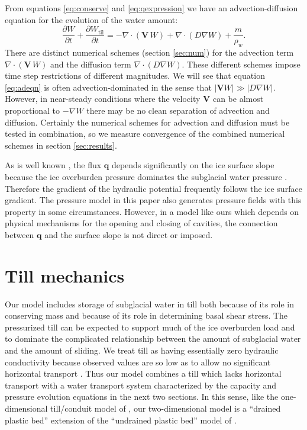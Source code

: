 \documentclass[11pt,final]{amsart}
\newcommand\bV{\mathbf{V}}
\newcommand\bq{\mathbf{q}}
\newcommand{\Div}{\nabla\cdot}
\newcommand{\grad}{\nabla}
\newcommand{\Wtil}{W_{\text{til}}}
\begin{document}
From equations \eqref{eq:conserve} and \eqref{eq:qexpression} we have an advection-diffusion equation \citep{HundsdorferVerwer2010} for the evolution of the water amount:
\begin{equation} \label{eq:adeqn}
  \frac{\partial W}{\partial t} + \frac{\partial \Wtil}{\partial t} = - \Div\left(\bV\, W\right) + \Div \left(D \grad W\right) + \frac{m}{\rho_w}.
\end{equation}
There are distinct numerical schemes (section \ref{sec:num}) for the advection term $\Div\left(\bV\, W\right)$ and the diffusion term $\Div \left(D \grad W\right)$.  These different schemes impose time step restrictions of different magnitudes.  We will see that equation \eqref{eq:adeqn} is often advection-dominated in the sense that $|\bV W| \gg |D \grad W|$.  However, in near-steady conditions where the velocity $\bV$ can be almost proportional to $-\grad W$ there may be no clean separation of advection and diffusion.  Certainly the numerical schemes for advection and diffusion must be tested in combination, so we measure convergence of the combined numerical schemes in section \ref{sec:results}.

As is well known \citep{Clarke05}, the flux $\bq$ depends significantly on the ice surface slope because the ice overburden pressure dominates the subglacial water pressure \citep{Shreve1972}.  Therefore the gradient of the hydraulic potential frequently follows the ice surface gradient.  The pressure model in this paper also generates pressure fields with this property in some circumstances.  However, in a model like ours which depends on physical mechanisms for the opening and closing of cavities, the connection between $\bq$ and the surface slope is not direct or imposed.



\section{Till mechanics} \label{sec:tillmechanics}

Our model includes storage of subglacial water in till both because of its role in conserving mass and because of its role in determining basal shear stress.  The pressurized till can be expected to support much of the ice overburden load and to dominate the complicated relationship between the amount of subglacial water and the amount of sliding.  We treat till as having essentially zero hydraulic conductivity because observed values are so low as to allow no significant horizontal transport \citep{LingleBrown1987,Tulaczyketal2000}.  Thus our model combines a till which lacks horizontal transport with a water transport system characterized by the capacity and pressure evolution equations in the next two sections.  In this sense, like the one-dimensional till/conduit model of \cite{vanderWeletal2013}, our two-dimensional model is a ``drained plastic bed'' extension of the ``undrained plastic bed'' model of \cite{Tulaczyketal2000b}.
\end{document}
